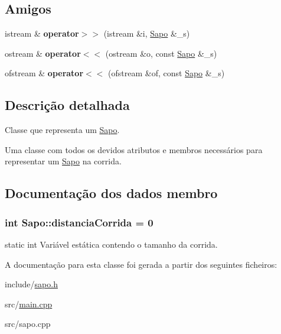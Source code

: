 \subsection*{Amigos}
\begin{DoxyCompactItemize}
\item 
istream \& {\bfseries operator$>$$>$} (istream \&i, \hyperlink{classSapo}{Sapo} \&\+\_\+s)\hypertarget{classSapo_a73378689a1d6326dd472e2589f2d0829}{}\label{classSapo_a73378689a1d6326dd472e2589f2d0829}

\item 
ostream \& {\bfseries operator$<$$<$} (ostream \&o, const \hyperlink{classSapo}{Sapo} \&\+\_\+s)\hypertarget{classSapo_aee33b9343a7dc060d778eff236afc8eb}{}\label{classSapo_aee33b9343a7dc060d778eff236afc8eb}

\item 
ofstream \& {\bfseries operator$<$$<$} (ofstream \&of, const \hyperlink{classSapo}{Sapo} \&\+\_\+s)\hypertarget{classSapo_a6d5f849e2bd197bf4b4d10cf4ca428f5}{}\label{classSapo_a6d5f849e2bd197bf4b4d10cf4ca428f5}

\end{DoxyCompactItemize}


\subsection{Descrição detalhada}
Classe que representa um \hyperlink{classSapo}{Sapo}. 

Uma classe com todos os devidos atributos e membros necessários para representar um \hyperlink{classSapo}{Sapo} na corrida. 

\subsection{Documentação dos dados membro}
\subsubsection[{\texorpdfstring{distancia\+Corrida}{distanciaCorrida}}]{\setlength{\rightskip}{0pt plus 5cm}int Sapo\+::distancia\+Corrida = 0\hspace{0.3cm}{\ttfamily [static]}}\hypertarget{classSapo_a27db8e8195d914b42d78114c02fe3fc2}{}\label{classSapo_a27db8e8195d914b42d78114c02fe3fc2}
static int Variável estática contendo o tamanho da corrida. 

A documentação para esta classe foi gerada a partir dos seguintes ficheiros\+:\begin{DoxyCompactItemize}
\item 
include/\hyperlink{sapo_8h}{sapo.\+h}\item 
src/\hyperlink{main_8cpp}{main.\+cpp}\item 
src/sapo.\+cpp\end{DoxyCompactItemize}
